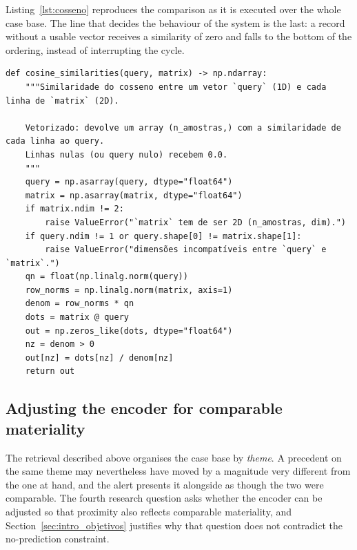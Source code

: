 Listing~\ref{lst:cosseno} reproduces the comparison as it is executed over the whole case base. The line that decides the behaviour of the system is the last: a record without a usable vector receives a similarity of zero and falls to the bottom of the ordering, instead of interrupting the cycle.

\begin{lstlisting}[caption={[The comparison at the core of retrieval]The comparison at the core of retrieval, vectorised over the whole case base. The decision that matters is the last one: a null vector receives a similarity of zero rather than raising, because a record without an embedding must fall to the bottom of the ordering and not interrupt the cycle. Reproduced from the source file; the comment is in the original.}, label={lst:cosseno}, float=htbp]
def cosine_similarities(query, matrix) -> np.ndarray:
    """Similaridade do cosseno entre um vetor `query` (1D) e cada linha de `matrix` (2D).

    Vetorizado: devolve um array (n_amostras,) com a similaridade de cada linha ao query.
    Linhas nulas (ou query nulo) recebem 0.0.
    """
    query = np.asarray(query, dtype="float64")
    matrix = np.asarray(matrix, dtype="float64")
    if matrix.ndim != 2:
        raise ValueError("`matrix` tem de ser 2D (n_amostras, dim).")
    if query.ndim != 1 or query.shape[0] != matrix.shape[1]:
        raise ValueError("dimensões incompatíveis entre `query` e `matrix`.")
    qn = float(np.linalg.norm(query))
    row_norms = np.linalg.norm(matrix, axis=1)
    denom = row_norms * qn
    dots = matrix @ query
    out = np.zeros_like(dots, dtype="float64")
    nz = denom > 0
    out[nz] = dots[nz] / denom[nz]
    return out
\end{lstlisting}

\subsection{Adjusting the encoder for comparable materiality}
\label{sec:met_qi4}

The retrieval described above organises the case base by \emph{theme}. A precedent on the same
theme may nevertheless have moved by a magnitude very different from the one at hand, and the
alert presents it alongside as though the two were comparable. The fourth research question asks
whether the encoder can be adjusted so that proximity also reflects comparable materiality, and
Section~\ref{sec:intro_objetivos} justifies why that question does not contradict the
no-prediction constraint.

